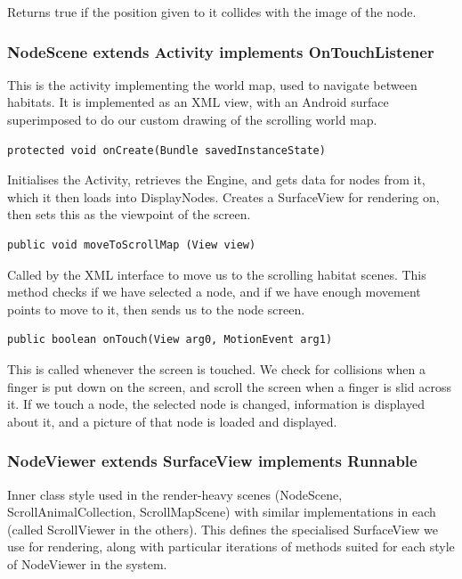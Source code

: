 \documentclass[12pt,a4paper,twoside]{article}
\begin{document}
Returns true if the position given to it collides with the image of the node.

\subsubsection{NodeScene extends Activity implements OnTouchListener}

This is the activity implementing the world map, used to navigate between habitats. It is implemented as an XML view, with an Android surface superimposed to do our custom drawing of the scrolling world map.

\begin{verbatim}
protected void onCreate(Bundle savedInstanceState)
\end{verbatim}

Initialises the Activity, retrieves the Engine, and gets data for nodes from it, which it then loads into DisplayNodes. Creates a SurfaceView for rendering on, then sets this as the viewpoint of the screen.

\begin{verbatim}
public void moveToScrollMap (View view)
\end{verbatim}

Called by the XML interface to move us to the scrolling habitat scenes. This method checks if we have selected a node, and if we have enough movement points to move to it, then sends us to the node screen.

\begin{verbatim}
public boolean onTouch(View arg0, MotionEvent arg1)
\end{verbatim}

This is called whenever the screen is touched. We check for collisions when a finger is put down on the screen, and scroll the screen when a finger is slid across it. If we touch a node, the selected node is changed, information is displayed about it, and a picture of that node is loaded and displayed.

\subsubsection{NodeViewer extends SurfaceView implements Runnable}

Inner class style used in the render-heavy scenes (NodeScene, ScrollAnimalCollection, ScrollMapScene) with similar implementations in each (called ScrollViewer in the others). This defines the specialised SurfaceView we use for rendering, along with particular iterations of methods suited for each style of NodeViewer in the system.
\end{document}
